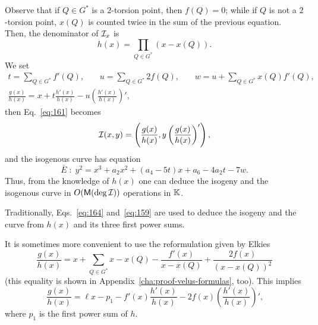Observe that if $Q\in G^\ast$ is a $2$-torsion point, then $f(Q)=0$;
while if $Q$ is not a $2$-torsion point, $x(Q)$ is counted twice in
the sum of the previous equation. Then, the denominator of $\mathcal{I}_x$ is
  \begin{equation}
    \label{eq:158}
    h(x) = \prod_{Q\in G^\ast}(x - x(Q))
    \text{.}
  \end{equation}
We set
\begin{equation}
  \label{eq:164}
  \begin{gathered}
    t = \sum_{Q\in G^\ast} f'(Q)\text{,}
    \qquad
    u = \sum_{Q\in G^\ast} 2f(Q)\text{,}
    \qquad
    w = u + \sum_{Q\in G^\ast} x(Q)f'(Q)\text{,}\\
    \frac{g(x)}{h(x)} = x + t\frac{h'(x)}{h(x)} - u\left(\frac{h'(x)}{h(x)}\right)'
    \text{,}
  \end{gathered}
\end{equation}
then Eq.~\eqref{eq:161} becomes
\begin{equation}
  \label{eq:159}
  \mathcal{I}(x,y) = \left(\frac{g(x)}{h(x)}, y\left(\frac{g(x)}{h(x)}\right)'\right)
  \text{,}
\end{equation}
and the isogenous curve has equation
\begin{equation}
  \label{eq:163}
  \bar{E}\;:\;y^2 = x^3 + a_2x^2 + (a_4-5t)x + a_6 - 4a_2t - 7w
  \text{.}
\end{equation}
Thus, from the knowledge of $h(x)$ one can deduce the isogeny and the
isogenous curve in $O(\mathsf{M}(\deg\mathcal{I}))$ operations in $\mathbb{K}$.

\begin{remark}
  Traditionally, Eqs.~\eqref{eq:164} and~\eqref{eq:159} are used to
  deduce the isogeny and the curve from $h(x)$ and its three first
  power sums.

    It is sometimes more
  convenient to use the reformulation given by Elkies~\cite{elkies98}
  \begin{equation}
    \label{eq:157}
    \frac{g(x)}{h(x)} = x + \sum_{Q\in G^\ast}x - x(Q) - \frac{f'(x)}{x-x(Q)} + \frac{2f(x)}{(x-x(Q))^2}
  \end{equation}
  (this equality is shown in Appendix~\ref{cha:proof-velus-formulas},
  too). This implies
  \begin{equation}
    \label{eq:165}
    \frac{g(x)}{h(x)} = \ell x - p_1 - f'(x)\frac{h'(x)}{h(x)} -
    2f(x)\left(\frac{h'(x)}{h(x)}\right)'
    \text{,}
  \end{equation}
  where $p_1$ is the first power sum of $h$.
\end{remark}


